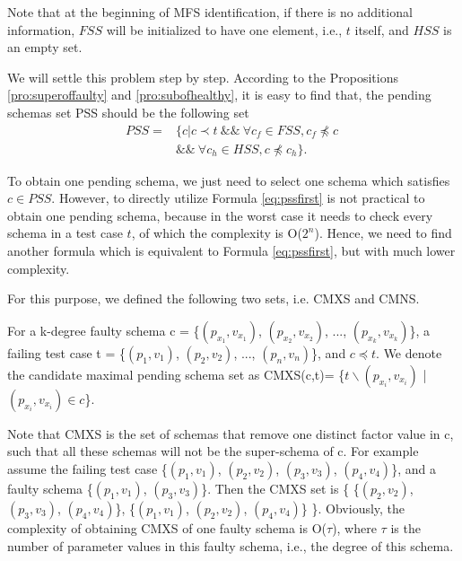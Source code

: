 \documentclass{sig-alternate-05-2015}
\begin{document}
Note that at the beginning of MFS identification, if there is no additional information, $FSS$ will be initialized to have one element, i.e., $t$ itself, and $HSS$ is an empty set.

We will settle this problem step by step. According to the Propositions \ref{pro:superoffaulty} and \ref{pro:subofhealthy}, it is easy to find that, the pending schemas set PSS should be the following set \begin{equation}\begin{aligned}\label{eq:pssfirst}PSS=&\{ c | c \prec t\ \&\&\ \forall c_{f} \in FSS,  c_{f} \npreceq c\ \\ & \&\&\  \forall c_{h} \in HSS, c \npreceq c_{h} \} .\end{aligned} \end{equation}

To obtain one pending schema, we just need to select one schema which satisfies $ c \in PSS$. However, to directly utilize Formula \ref{eq:pssfirst} is not practical to obtain one pending schema, because in the worst case it needs to check every schema in a test case $t$, of which the complexity is O($2^{n}$). Hence, we need to find another formula which is equivalent to Formula \ref{eq:pssfirst}, but with much lower complexity.

For this purpose, we defined the following two sets, i.e. CMXS and CMNS.

\begin{definition}
For a k-degree faulty schema c = \{$(p_{x_{1}}, v_{x_{1}})$, $(p_{x_{2}}, v_{x_{2}})$, ..., $(p_{x_{k}}, v_{x_{k}})$\}, a failing test case t = \{$(p_{1}, v_{1})$, $(p_{2}, v_{2})$, ..., $(p_{n}, v_{n})$\}, and $c \preceq t$. We denote the candidate maximal pending schema set as CMXS(c,t)= \{$t \backslash (p_{x_{i}}, v_{x_{i}})$ | $(p_{x_{i}}, v_{x_{i}}) \in c $\}.
\end{definition}

Note that CMXS is the set of schemas that remove one distinct factor value in c, such that all these schemas will not be the super-schema of c. For example assume the failing test case \{$(p_{1}, v_{1})$, $(p_{2}, v_{2})$, $(p_{3}, v_{3})$, $(p_{4}, v_{4})$\}, and a faulty schema \{$(p_{1}, v_{1})$, $(p_{3}, v_{3})$\}. Then the CMXS set is \{ \{$(p_{2}, v_{2})$,  $(p_{3}, v_{3})$, $(p_{4}, v_{4})$\}, \{$(p_{1}, v_{1})$,  $(p_{2}, v_{2})$, $(p_{4}, v_{4})$\} \}. Obviously, the complexity of obtaining CMXS of one faulty schema is O($\tau$), where $\tau$ is the number of parameter values in this faulty schema, i.e., the degree of this schema.
\end{document}
